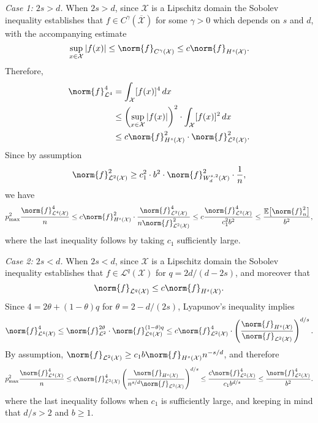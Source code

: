\documentclass{article}
\newcommand{\abs}[1]{\left \lvert #1 \right \rvert}
\newcommand{\1}{\mathbf{1}}
\newcommand{\Xset}{\mathcal{X}}
\newcommand{\Leb}{\mathcal{L}}
\newcommand{\Ebb}{\mathbb{E}}
\theoremstyle{alden}
\theoremstyle{aldenthm}
\theoremstyle{definition}
\theoremstyle{remark}
\begin{document}
\textit{Case 1: $2s > d$.}
When $2s > d$, since $\Xset$ is a Lipschitz domain the Sobolev inequality establishes that $f \in C^{\gamma}(\overline{\Xset})$ for some $\gamma > 0$ which depends on $s$ and $d$, with the accompanying estimate
\begin{equation*}
\sup_{x \in \Xset} \abs{f(x)} \leq \norm{f}_{C^{\gamma}(\Xset)} \leq c \norm{f}_{H^s(\Xset)}.
\end{equation*}
Therefore,
\begin{align*}
\norm{f}_{\Leb^4}^4 & = \int_{\Xset} [f(x)]^4 \,dx \\
& \leq \left(\sup_{x \in \Xset} \abs{f(x)}\right)^2 \cdot \int_{\Xset} [f(x)]^2 \,dx \\
& \leq c \norm{f}_{H^s(\Xset)}^2 \cdot \norm{f}_{\Leb^2(\Xset)}^2.
\end{align*}
Since by assumption
\begin{equation*}
\norm{f}_{\Leb^2(\Xset)}^2 \geq c_1^2 \cdot b^2 \cdot \norm{f}_{W_d^{s,2}(\Xset)}^2 \cdot \frac{1}{n},
\end{equation*}
we have
\begin{equation*}
p_{\max}^2\frac{\norm{f}_{\Leb^4(\Xset)}^4}{n} \leq c \norm{f}_{H^s(\Xset)}^2 \cdot \frac{\norm{f}_{\Leb^2(\Xset)}^4}{n \norm{f}_{\Leb^2(\Xset)}^2} \leq c \frac{\norm{f}_{\Leb^2(\Xset)}^4}{c_1^2 b^2} \leq \frac{\Ebb\bigl[\norm{f}_n^2\bigr]}{b^2},
\end{equation*}
where the last inequality follows by taking $c_1$ sufficiently large.

\textit{Case 2: $2s < d$.}
When $2s < d$, since $\Xset$ is a Lipschitz domain the Sobolev inequality establishes that $f \in \Leb^q(\Xset)$ for $q = 2d/(d - 2s)$, and moreover that
\begin{equation*}
\norm{f}_{\Leb^q(\Xset)} \leq c \norm{f}_{H^s(\Xset)}.
\end{equation*}
Since $4 = 2\theta + (1 - \theta)q$ for $\theta = 2 - d/(2s)$, Lyapunov's inequality implies
\begin{equation*}
\norm{f}_{\Leb^4(\Xset)}^4 \leq \norm{f}_{\Leb^2}^{2\theta} \cdot \norm{f}_{\Leb^q(\Xset)}^{(1 - \theta)q} \leq c \norm{f}_{\Leb^2(\Xset)}^{4} \cdot \left(\frac{\norm{f}_{H^s(\Xset)}}{\norm{f}_{\Leb^2(\Xset)}}\right)^{d/s}.
\end{equation*}
By assumption, $\norm{f}_{\Leb^2(\Xset)} \geq c_1 b \norm{f}_{H^s(\Xset)} n^{-s/d}$, and therefore
\begin{equation*}
p_{\max}^2 \frac{\norm{f}_{\Leb^4(\Xset)}^4}{n} \leq c\norm{f}_{\Leb^2(\Xset)}^4 \left(\frac{\norm{f}_{H^s(\Xset)}}{n^{s/d}\norm{f}_{\Leb^2(\Xset)}}\right)^{d/s} \leq \frac{c\norm{f}_{\Leb^2(\Xset)}^4}{c_1b^{d/s}} \leq \frac{\norm{f}_{\Leb^2(\Xset)}^4}{b^2}.
\end{equation*}
where the last inequality follows when $c_1$ is sufficiently large, and keeping in mind that $d/s > 2$ and $b \geq 1$. 
\end{document}

